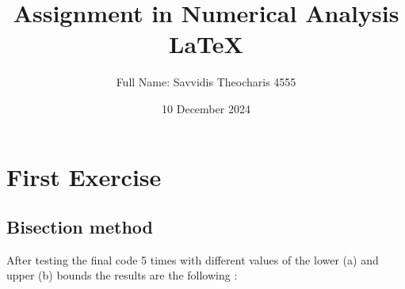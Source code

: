 \documentclass{article}
\title{Assignment in Numerical Analysis LaTeX}
\author{Full Name: Savvidis Theocharis 4555}
\date{10 December 2024}
\begin{document}
\maketitle

\section{First Exercise}

\subsection{Bisection method}

After testing the final code 5 times with different values of the lower (a) and upper (b) bounds the results are the following :
\end{document}
